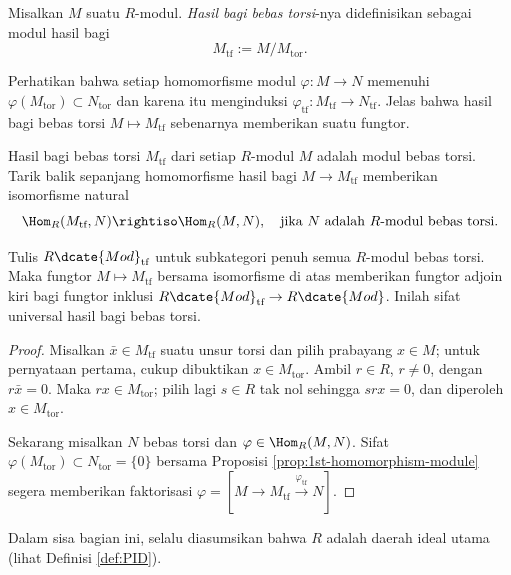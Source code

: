 \begin{definition}
	Misalkan $M$ suatu $R$-modul. \emph{Hasil bagi bebas torsi}-nya didefinisikan sebagai modul hasil bagi 
	\[ M_\text{tf} := M/M_\text{tor}. \]
\end{definition}
Perhatikan bahwa setiap homomorfisme modul $\varphi: M \to N$ memenuhi $\varphi(M_\text{tor}) \subset N_\text{tor}$ dan karena itu menginduksi $\varphi_\text{tf}: M_\text{tf} \to N_\text{tf}$. Jelas bahwa hasil bagi bebas torsi $M \mapsto M_\text{tf}$ sebenarnya memberikan suatu fungtor.

\begin{lemma}
	Hasil bagi bebas torsi $M_\text{tf}$ dari setiap $R$-modul $M$ adalah modul bebas torsi. Tarik balik sepanjang homomorfisme hasil bagi $M \to M_\text{tf}$ memberikan isomorfisme natural
	\[ \Hom_R(M_\text{tf}, N) \rightiso \Hom_R(M, N), \quad \text{jika $N$ adalah $R$-modul bebas torsi.} \]
\end{lemma}
Tulis $R\dcate{Mod}_\text{tf}$ untuk subkategori penuh semua $R$-modul bebas torsi. Maka fungtor $M \mapsto M_\text{tf}$ bersama isomorfisme di atas memberikan fungtor adjoin kiri bagi fungtor inklusi $R\dcate{Mod}_\text{tf} \to R\dcate{Mod}$. Inilah sifat universal hasil bagi bebas torsi.

\begin{proof}
	Misalkan $\bar{x} \in M_\text{tf}$ suatu unsur torsi dan pilih prabayang $x \in M$; untuk pernyataan pertama, cukup dibuktikan $x \in M_\text{tor}$. Ambil $r \in R$, $r \neq 0$, dengan $r\bar{x} = 0$. Maka $rx \in M_\text{tor}$; pilih lagi $s \in R$ tak nol sehingga $srx=0$, dan diperoleh $x \in M_\text{tor}$.

	Sekarang misalkan $N$ bebas torsi dan $\varphi \in \Hom_R(M, N)$. Sifat $\varphi(M_\text{tor}) \subset N_\text{tor} = \{0\}$ bersama Proposisi \ref{prop:1st-homomorphism-module} segera memberikan faktorisasi $\varphi = [M \to M_\text{tf} \xrightarrow{\varphi_\text{tf}} N]$.
\end{proof}

\begin{convention}
	Dalam sisa bagian ini, selalu diasumsikan bahwa $R$ adalah daerah ideal utama (lihat Definisi \ref{def:PID}).
\end{convention}

